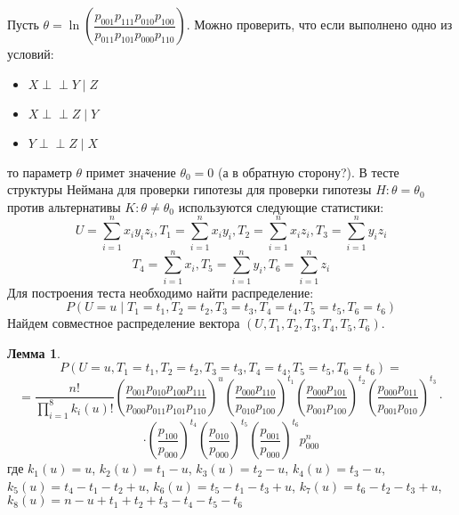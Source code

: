 \documentclass[a4paper,14pt]{extarticle}
\theoremstyle{definition}
\newtheorem{lemma}{Лемма}[section]
\def\ci{\perp\!\!\!\perp}
\begin{document}
Пусть $\theta = \ln  \left(\dfrac{p_{001}p_{111}p_{010}p_{100}}{p_{011}p_{101}p_{000}p_{110}}\right)$.
Можно проверить, что если выполнено одно из условий:
\begin{itemize}
    \item $X \ci Y \mid Z$
    \item $X \ci Z \mid Y$
    \item $Y \ci Z \mid X$
\end{itemize}
то параметр $\theta$ примет значение $\theta_0=0$ (а в обратную сторону?). В тесте структуры Неймана для проверки гипотезы для проверки гипотезы
$H: \theta = \theta_0$ против альтернативы $K: \theta \neq \theta_0$ используются следующие статистики:
$$
    U = \sum_{i=1}^n x_i y_i z_i,
    T_1 = \sum_{i=1}^n x_i y_i,
    T_2 = \sum_{i=1}^n x_i z_i,
    T_3 = \sum_{i=1}^n y_i z_i
$$
$$
    T_4 = \sum_{i=1}^n x_i,
    T_5 = \sum_{i=1}^n y_i,
    T_6 = \sum_{i=1}^n z_i
$$
Для построения теста необходимо найти распределение:
$$
    P(U=u \mid T_1=t_1, T_2=t_2, T_3=t_3, T_4=t_4, T_5=t_5, T_6=t_6)
$$
Найдем совместное распределение вектора $(U,T_1,T_2,T_3,T_4,T_5,T_6)$.
\begin{lemma}
    $$P(U=u, T_1=t_1, T_2=t_2, T_3=t_3, T_4=t_4, T_5=t_5, T_6=t_6)=$$
    $$=\frac{n!}{\prod_{i=1}^8 k_i(u)!} \left(\dfrac{p_{001}p_{010}p_{100}p_{111}}{p_{000}p_{011}p_{101}p_{110}}\right)^u
        \left(\dfrac{p_{000} p_{110}}{p_{010} p_{100}}\right)^{t_1}\left(\dfrac{p_{000}p_{101}}{p_{001}p_{100}}\right)^{t_2}
        \left(\dfrac{p_{000}p_{011}}{p_{001}p_{010}}\right)^{t_3} \cdot$$
    $$
        \cdot\left(\dfrac{p_{100}}{p_{000}}\right)^{t_4}
        \left(\dfrac{p_{010}}{p_{000}}\right)^{t_5} \left(\dfrac{p_{001}}{p_{000}}\right)^{t_6} p_{000}^n
    $$
    где
    $k_1(u)=u$, $k_2(u)=t_1-u$, $k_3(u)=t_2-u$, $k_4(u)=t_3-u$, $k_5(u)=t_4-t_1-t_2+u$, $k_6(u)=t_5-t_1-t_3+u$,
    $k_7(u)=t_6 - t_2 - t_3 + u$, $k_8(u)=n-u+t_1+t_2+t_3-t_4-t_5-t_6$
\end{lemma}
\end{document}
